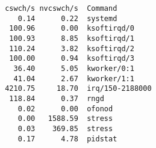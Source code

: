 \begin{frame}[containsverbatim]
\begin{verbatim}
 cswch/s nvcswch/s  Command
    0.14      0.22  systemd
  100.96      0.00  ksoftirqd/0
  100.93      8.85  ksoftirqd/1
  110.24      3.82  ksoftirqd/2
  100.00      0.94  ksoftirqd/3
   36.40      5.05  kworker/0:1
   41.04      2.67  kworker/1:1
 4210.75     18.70  irq/150-2188000
  118.84      0.37  rngd
    0.02      0.00  ofonod
    0.00   1588.59  stress
    0.03    369.85  stress
    0.17      4.78  pidstat
\end{verbatim}
\end{frame}
\begin{frame}

\end{frame}
